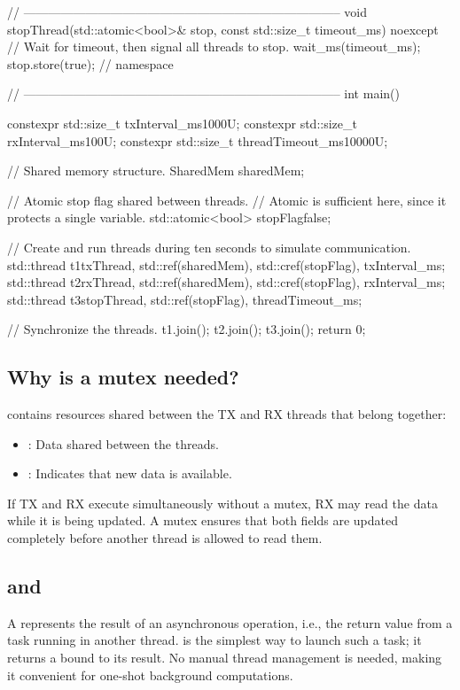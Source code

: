 \begin{cppcode}
{// -----------------------------------------------------------------------------
void stopThread(std::atomic<bool>& stop, const std::size_t timeout_ms) noexcept
{
    // Wait for timeout, then signal all threads to stop.
    wait_ms(timeout_ms);
    stop.store(true);
}
} // namespace

// -----------------------------------------------------------------------------
int main()
{
    constexpr std::size_t txInterval_ms{1000U};
    constexpr std::size_t rxInterval_ms{100U};
    constexpr std::size_t threadTimeout_ms{10000U};

    // Shared memory structure.
    SharedMem sharedMem{};

    // Atomic stop flag shared between threads.
    // Atomic is sufficient here, since it protects a single variable.
    std::atomic<bool> stopFlag{false};

    // Create and run threads during ten seconds to simulate communication.
    std::thread t1{txThread, std::ref(sharedMem), std::cref(stopFlag), txInterval_ms};
    std::thread t2{rxThread, std::ref(sharedMem), std::cref(stopFlag), rxInterval_ms};
    std::thread t3{stopThread, std::ref(stopFlag), threadTimeout_ms};

    // Synchronize the threads.
    t1.join();
    t2.join();
    t3.join();
    return 0;
}
\end{cppcode}

\subsection{Why is a mutex needed?}
\label{c6:sec:whymutex}
 contains resources shared between the TX and RX threads that belong together:
\begin{itemize}
  \item {}: Data shared between the threads.
  \item {}: Indicates that new data is available.
\end{itemize}
If TX and RX execute simultaneously without a mutex, RX may read the data while it is being
updated. A mutex ensures that both fields are updated completely before another thread is allowed
to read them.

\subsection{ and }
\label{c6:sec:async}
A  represents the result of an asynchronous operation, i.e., the return value
from a task running in another thread.  is the simplest way to launch such a task;
it returns a  bound to its result. No manual thread management is needed, making
it convenient for one-shot background computations.

